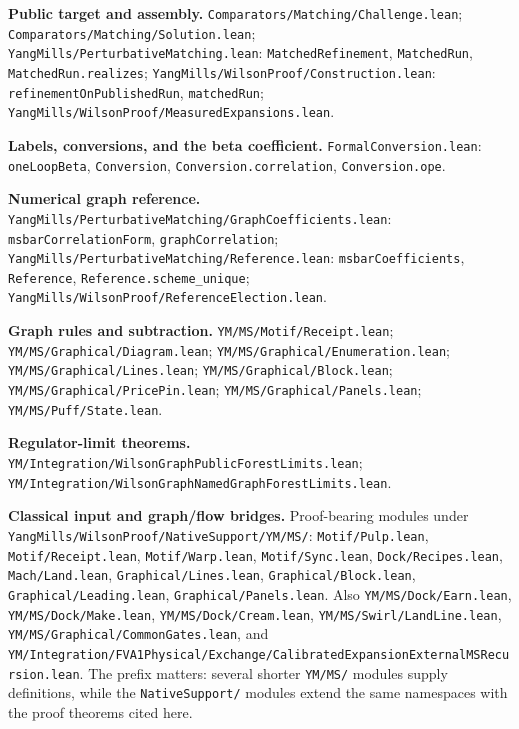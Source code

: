 \documentclass[11pt]{article}
\newcommand{\code}[1]{{\small\nolinkurl{#1}}}
\newcommand{\src}[1]{\textsf{[#1]}}
\begin{document}
\begin{description}[leftmargin=3em,labelwidth=2.6em,align=left]
\item[\src{T}] \textbf{Public target and assembly.}
\code{Comparators/Matching/Challenge.lean};
\code{Comparators/Matching/Solution.lean};
\code{YangMills/PerturbativeMatching.lean}:
\code{MatchedRefinement}, \code{MatchedRun}, \code{MatchedRun.realizes};
\code{YangMills/WilsonProof/Construction.lean}:
\code{refinementOnPublishedRun}, \code{matchedRun};
\code{YangMills/WilsonProof/MeasuredExpansions.lean}.

\item[\src{F}] \textbf{Labels, conversions, and the beta coefficient.}
\code{FormalConversion.lean}:
\code{oneLoopBeta}, \code{Conversion},
\code{Conversion.correlation}, \code{Conversion.ope}.

\item[\src{G}] \textbf{Numerical graph reference.}
\code{YangMills/PerturbativeMatching/GraphCoefficients.lean}:
\code{msbarCorrelationForm}, \code{graphCorrelation};
\code{YangMills/PerturbativeMatching/Reference.lean}:
\code{msbarCoefficients}, \code{Reference}, \code{Reference.scheme_unique};
\code{YangMills/WilsonProof/ReferenceElection.lean}.

\item[\src{D}] \textbf{Graph rules and subtraction.}
\code{YM/MS/Motif/Receipt.lean};
\code{YM/MS/Graphical/Diagram.lean};
\code{YM/MS/Graphical/Enumeration.lean};
\code{YM/MS/Graphical/Lines.lean};
\code{YM/MS/Graphical/Block.lean};
\code{YM/MS/Graphical/PricePin.lean};
\code{YM/MS/Graphical/Panels.lean};
\code{YM/MS/Puff/State.lean}.

\item[\src{R}] \textbf{Regulator-limit theorems.}
\code{YM/Integration/WilsonGraphPublicForestLimits.lean};
\code{YM/Integration/WilsonGraphNamedGraphForestLimits.lean}.

\item[\src{B}] \textbf{Classical input and graph/flow bridges.}
Proof-bearing modules under
\code{YangMills/WilsonProof/NativeSupport/YM/MS/}:
\code{Motif/Pulp.lean}, \code{Motif/Receipt.lean},
\code{Motif/Warp.lean}, \code{Motif/Sync.lean},
\code{Dock/Recipes.lean}, \code{Mach/Land.lean},
\code{Graphical/Lines.lean}, \code{Graphical/Block.lean},
\code{Graphical/Leading.lean}, \code{Graphical/Panels.lean}.
Also \code{YM/MS/Dock/Earn.lean}, \code{YM/MS/Dock/Make.lean},
\code{YM/MS/Dock/Cream.lean}, \code{YM/MS/Swirl/LandLine.lean},
\code{YM/MS/Graphical/CommonGates.lean}, and
\code{YM/Integration/FVA1Physical/Exchange/CalibratedExpansionExternalMSRecursion.lean}.
The prefix matters: several shorter \code{YM/MS/} modules supply
definitions, while the \code{NativeSupport/} modules extend the same
namespaces with the proof theorems cited here.


\end{description}
\end{document}
